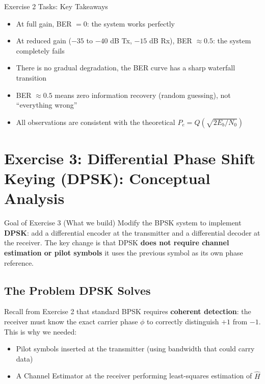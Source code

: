 \begin{SummaryBox}{Exercise 2 Tasks: Key Takeaways}
\begin{itemize}
\item At full gain, BER $= 0$: the system works perfectly
\item At reduced gain ($-35$ to $-40$ dB Tx, $-15$ dB Rx), BER $\approx 0.5$: the system completely fails
\item There is no gradual degradation, the BER curve has a sharp waterfall transition
\item BER $\approx 0.5$ means zero information recovery (random guessing), not ``everything wrong''
\item All observations are consistent with the theoretical $P_e = Q(\sqrt{2E_b/N_0})$
\end{itemize}
\end{SummaryBox}

\newpage
\section{Exercise 3: Differential Phase Shift Keying (DPSK): Conceptual Analysis}
\label{sec:ex3-analysis}

\begin{GoalBox}{Goal of Exercise 3 (What we build)}
Modify the BPSK system to implement \textbf{DPSK}: add a differential encoder at the transmitter and a differential decoder at the receiver. The key change is that DPSK \textbf{does not require channel estimation or pilot symbols} it uses the previous symbol as its own phase reference.
\end{GoalBox}

\subsection{The Problem DPSK Solves}

Recall from Exercise 2 that standard BPSK requires \textbf{coherent detection}: the receiver must know the exact carrier phase $\phi$ to correctly distinguish $+1$ from $-1$. This is why we needed:

\begin{itemize}
\item Pilot symbols inserted at the transmitter (using bandwidth that could carry data)
\item A Channel Estimator at the receiver performing least-squares estimation of $\hat{H}$
\end{itemize}

